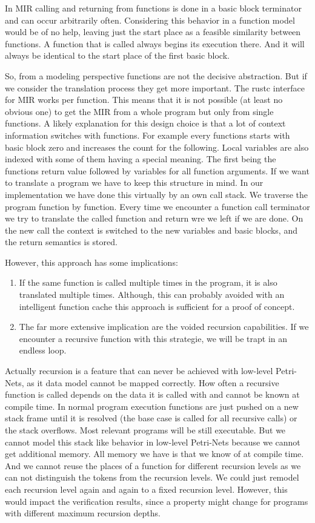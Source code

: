 In MIR calling and returning from functions is done in a basic block terminator and can occur arbitrarily often.
Considering this behavior in a function model would be of no help, leaving just the start place as a feasible similarity between functions.
A function that is called always begins its execution there.
And it will always be identical to the start place of the first basic block.

So, from a modeling perspective functions are not the decisive abstraction.
But if we consider the translation process they get more important.
The rustc interface for MIR works per function.
This means that it is not possible (at least no obvious one) to get the MIR from a whole program but only from single functions.
A likely explanation for this design choice is that a lot of context information switches with functions.
For example every functions starts with basic block zero and increases the count for the following.
Local variables are also indexed with some of them having a special meaning.
The first being the functions return value followed by variables for all function arguments.
If we want to translate a program we have to keep this structure in mind.
In our implementation we have done this virtually by an own call stack.
We traverse the program function by function.
Every time we encounter a function call terminator we try to translate the called function and return wre we left if we are done.
On the new call the context is switched to the new variables and basic blocks, and the return semantics is stored.

However, this approach has some implications:
\begin{enumerate}
    \item If the same function is called multiple times in the program, it is also translated multiple times.
    Although, this can probably avoided with an intelligent function cache this approach is sufficient for a proof of concept.
    \item The far more extensive implication are the voided recursion capabilities.
    If we encounter a recursive function with this strategie, we will be trapt in an endless loop.
\end{enumerate}
Actually recursion is a feature that can never be achieved with low-level Petri-Nets, as it data model cannot be mapped correctly.
How often a recursive function is called depends on the data it is called with and cannot be known at compile time.
In normal program execution functions are just pushed on a new stack frame until it is resolved (the base case is called for all recursive calls) or the stack overflows.
Most relevant programs will be still executable.
But we cannot model this stack like behavior in low-level Petri-Nets because we cannot get additional memory.
All memory we have is that we know of at compile time.
And we cannot reuse the places of a function for different recursion levels as we can not distinguish the tokens from the recursion levels.
We could just remodel each recursion level again and again to a fixed recursion level.
However, this would impact the verification results, since a property might change for programs with different maximum recursion depths.

